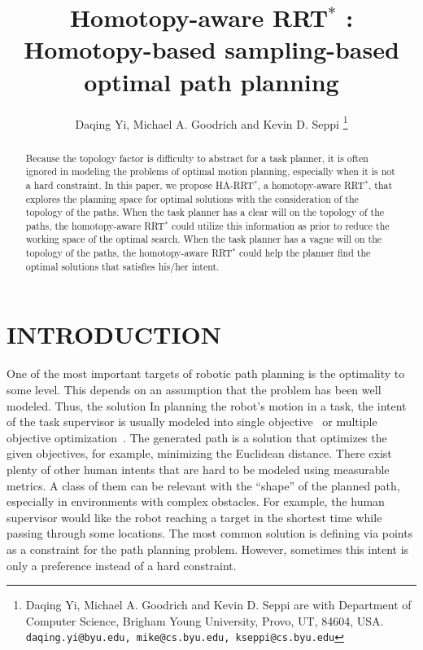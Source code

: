 \documentclass[letterpaper, 10 pt, conference]{ieeeconf}
\title{\LARGE \bf
Homotopy-aware RRT$^{*}$ : Homotopy-based sampling-based optimal path planning
}
\author{
Daqing Yi, Michael A. Goodrich and Kevin D. Seppi
\thanks{Daqing Yi, Michael A. Goodrich and Kevin D. Seppi are with Department of Computer Science, Brigham Young University, Provo, UT, 84604, USA.
{\tt\small daqing.yi@byu.edu, mike@cs.byu.edu, kseppi@cs.byu.edu} }
}
\begin{document}
\maketitle
\thispagestyle{empty}
\pagestyle{empty}


\begin{abstract}
Because the topology factor is difficulty to abstract for a task planner, it is often ignored in modeling the problems of optimal motion planning, especially when it is not a hard constraint.
In this paper, we propose HA-RRT$^{*}$, a homotopy-aware RRT$^{*}$, that explores the planning space for optimal solutions with the consideration of the topology of the paths.
When the task planner has a clear will on the topology of the paths, the homotopy-aware RRT$^{*}$ could utilize this information as prior to reduce the working space of the optimal search.
When the task planner has a vague will on the topology of the paths, the homotopy-aware RRT$^{*}$ could help the planner find the optimal solutions that satisfies his/her intent.


\end{abstract}

\section{INTRODUCTION}
\label{sec:intro}

One of the most important targets of robotic path planning is the optimality to some level.
This depends on an assumption that the problem has been well modeled.
Thus, the solution 
In planning the robot's motion in a task, the intent of the task supervisor is usually modeled into single objective~\cite{6974170} or multiple objective optimization~\cite{yi2014supporting}.
The generated path is a solution that optimizes the given objectives, for example, minimizing the Euclidean distance.
There exist plenty of other human intents that are hard to be modeled using measurable metrics.
A class of them can be relevant with the ``shape'' of the planned path, especially in environments with complex obstacles.
For example, the human supervisor would like the robot reaching a target in the shortest time while passing through some locations.
The most common solution is defining via points as a constraint for the path planning problem.
However, sometimes this intent is only a preference instead of a hard constraint.
\end{document}
